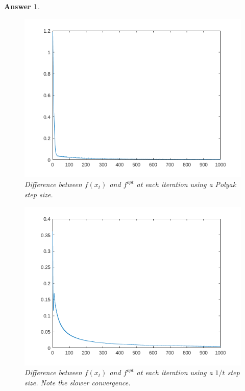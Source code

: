 \documentclass[12pt]{article}
\theoremstyle{colon}
\newtheorem*{answer}{Answer}
\begin{document}
\begin{answer}
\begin{enumerate}[label=\alph*)]
      \begin{figure}[H]
        \centering
          \includegraphics[width=\textwidth]{eta-polyak}
        \caption{Difference between $f(x_t)$ and $f^{opt}$ at each iteration using a Polyak step size.}
      \end{figure}

      \begin{figure}[H]
        \centering
          \includegraphics[width=\textwidth]{eta-t}
        \caption{Difference between $f(x_t)$ and $f^{opt}$ at each iteration using a $1/t$ step size. Note the slower convergence.}
      \end{figure}


\end{enumerate}
\end{answer}
\end{document}
